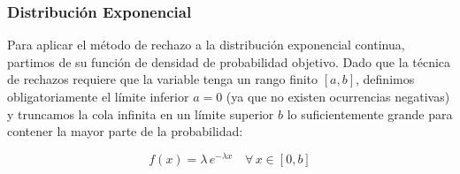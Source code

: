 \documentclass{article}
\begin{document}
\subsubsection{Distribución Exponencial}

Para aplicar el método de rechazo a la distribución exponencial continua, partimos de su
función de densidad de probabilidad objetivo. Dado que la técnica de rechazos requiere que
la variable tenga un rango finito $[a, b]$, definimos obligatoriamente el límite inferior $a = 0$
(ya que no existen ocurrencias negativas) y truncamos la cola infinita en un límite superior
$b$ lo suficientemente grande para contener la mayor parte de la probabilidad:

\begin{equation}
    f(x) = \lambda\, e^{-\lambda x} \quad \forall\, x \in [0, b]
\end{equation}
\end{document}
